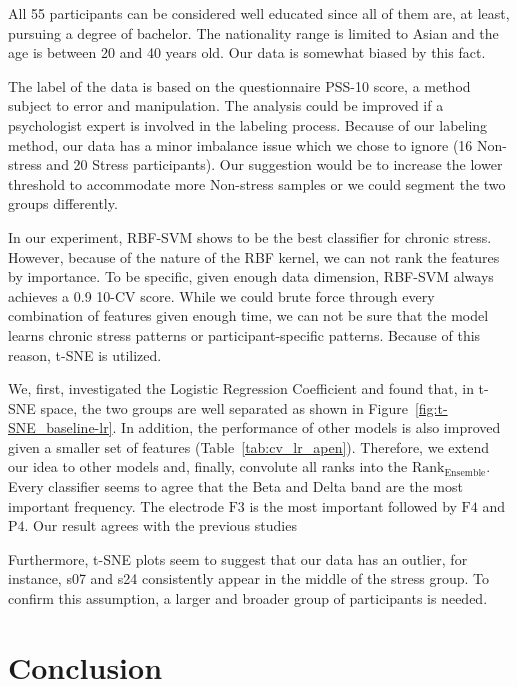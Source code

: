 \documentclass[pdflatex,sn-mathphys]{sn-jnl}%
\theoremstyle{thmstyleone}%
\theoremstyle{thmstyletwo}%
\theoremstyle{thmstylethree}%
\begin{document}
All 55 participants can be considered well educated since all of them are, at least, pursuing a degree of bachelor. The nationality range is limited to Asian and the age is between 20 and 40 years old. Our data is somewhat biased by this fact. 

The label of the data is based on the questionnaire PSS-10 score, a method subject to error and manipulation. The analysis could be improved if a psychologist expert is involved in the labeling process. Because of our labeling method, our data has a minor imbalance issue which we chose to ignore (16 Non-stress and 20 Stress participants). Our suggestion would be to increase the lower threshold to accommodate more Non-stress samples or we could segment the two groups differently.

In our experiment, RBF-SVM shows to be the best classifier for chronic stress. However, because of the nature of the RBF kernel, we can not rank the features by importance. To be specific, given enough data dimension, RBF-SVM always achieves a 0.9 10-CV score. While we could brute force through every combination of features given enough time, we can not be sure that the model learns chronic stress patterns or participant-specific patterns. Because of this reason, t-SNE is utilized. 

We, first, investigated the Logistic Regression Coefficient and found that, in t-SNE space, the two groups are well separated as shown in Figure~\ref{fig:t-SNE_baseline-lr}. In addition, the performance of other models is also improved given a smaller set of features (Table~\ref{tab:cv_lr_apen}). Therefore, we extend our idea to other models and, finally, convolute all ranks into the $\text{Rank}_{\text{Ensemble}}$. Every classifier seems to agree that the Beta and Delta band are the most important frequency. The electrode $\text{F3}$ is the most important followed by $\text{F4}$ and $\text{P4}$. Our result agrees with the previous studies \cite{Saeed2020}

Furthermore, t-SNE plots seem to suggest that our data has an outlier, for instance, s07 and s24 consistently appear in the middle of the stress group. To confirm this assumption, a larger and broader group of participants is needed. 

\section{Conclusion}\label{sec6}
\end{document}

